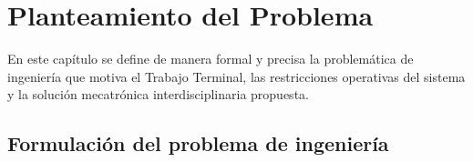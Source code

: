 
\chapter{Planteamiento del Problema}
\label{cap:planteamiento}

En este capítulo se define de manera formal y precisa la problemática de ingeniería que motiva el Trabajo Terminal, las restricciones operativas del sistema y la solución mecatrónica interdisciplinaria propuesta.

\section{Formulación del problema de ingeniería}
\label{sec:planteamiento-problema}

